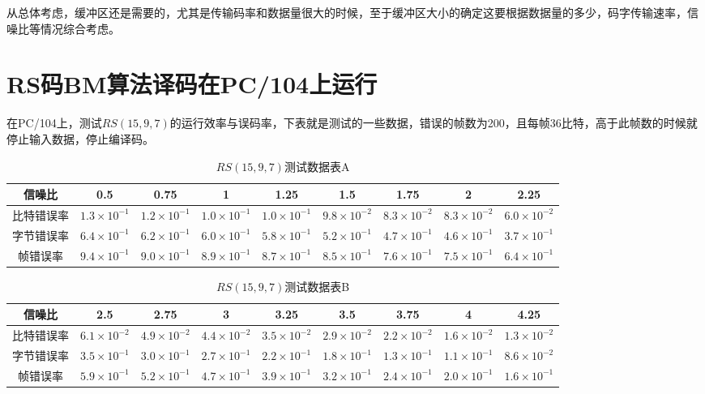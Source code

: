 从总体考虑，缓冲区还是需要的，尤其是传输码率和数据量很大的时候，至于缓冲区大小的确定这要根据数据量的多少，码字传输速率，信噪比等情况综合考虑。
\section{RS码BM算法译码在PC/104上运行}
在PC/104上，测试$RS(15,9,7)$的运行效率与误码率，下表就是测试的一些数据，错误的帧数为200，且每帧36比特，高于此帧数的时候就停止输入数据，停止编译码。
\begin{table}[hpb]
   \caption{$RS(15,9,7)$测试数据表A}
  \label{tab:5.5}
  \centering
    \wuhao
  \begin{tabular}{|c||c|c|c|c|c|c|c|c|}
  
    \hline
    信噪比&0.5&0.75&1&1.25&1.5&1.75&2&2.25\\
    \hline
    \hline
    比特错误率&$1.3\times 10^{-1}$&$1.2\times 10^{-1}$&$1.0\times
    10^{-1}$&$1.0\times 10^{-1}$&$9.8\times 10^{-2}$&$8.3\times
    10^{-2}$&$8.3\times 10^{-2}$&$6.0\times 10^{-2}$\\
    字节错误率&$6.4\times 10^{-1}$&$6.2\times 10^{-1}$&$6.0\times
    10^{-1}$&$5.8\times 10^{-1}$&$5.2\times 10^{-1}$&$4.7\times
    10^{-1}$&$4.6\times 10^{-1}$&$3.7\times 10^{-1}$\\
    帧错误率&$9.4\times 10^{-1}$&$9.0\times 10^{-1}$&$8.9\times
    10^{-1}$&$8.7\times 10^{-1}$&$8.5\times 10^{-1}$&$7.6\times
    10^{-1}$&$7.5\times 10^{-1}$&$6.4\times 10^{-1}$\\
    \hline
  \end{tabular}
 
\end{table}

\begin{table}[htpb]
   \caption{$RS(15,9,7)$测试数据表B}
  \label{tab:5.6}
  \centering
  \wuhao
  \begin{tabular}{|c||c|c|c|c|c|c|c|c|}
    \hline
    信噪比&2.5&2.75&3&3.25&3.5&3.75&4&4.25\\
    \hline
    \hline
    比特错误率&$6.1\times 10^{-2}$&$4.9\times 10^{-2}$&$4.4\times
    10^{-2}$&$3.5\times 10^{-2}$&$2.9\times 10^{-2}$&$2.2\times
    10^{-2}$&$1.6\times 10^{-2}$&$1.3\times 10^{-2}$\\
    字节错误率&$3.5\times 10^{-1}$&$3.0\times 10^{-1}$&$2.7\times
    10^{-1}$&$2.2\times 10^{-1}$&$1.8\times 10^{-1}$&$1.3\times
    10^{-1}$&$1.1\times 10^{-1}$&$8.6\times 10^{-2}$\\
    帧错误率&$5.9\times 10^{-1}$&$5.2\times 10^{-1}$&$4.7\times
    10^{-1}$&$3.9\times 10^{-1}$&$3.2\times 10^{-1}$&$2.4\times
    10^{-1}$&$2.0\times 10^{-1}$&$1.6\times 10^{-1}$\\
    \hline
  \end{tabular}
 
\end{table}

